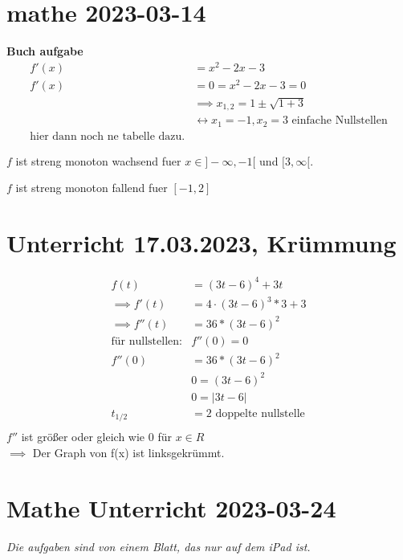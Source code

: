 \documentclass{book}
\begin{document}
\section{mathe 2023-03-14}
\textbf{Buch aufgabe}
\begin{align*}
    f'(x)&= x^2-2x-3\\
    f'(x)&=0=x^2-2x-3=0\\
         &\implies x_{1,2}=1\pm \sqrt{1+3}\\
         &\leftrightarrow x_1 = -1, x_2=\text{3 einfache Nullstellen}\\
         \text{hier dann noch ne tabelle dazu.}
\end{align*}

$f$ ist streng monoton wachsend fuer $x \in]-\infty, -1[$ und $[3,\infty [$.

$f$ ist streng monoton fallend fuer $[-1,2]$


\section{Unterricht 17.03.2023, Krümmung}

\begin{align*}
  f(t)&=(3t-6)^4+3t\\
  \implies f'(t)&=4\cdot (3t-6)^3*3+3\\
  \implies f''(t)&=36* (3t-6)^2\\
  \text{für nullstellen:} &f''(0)=0\\
  f''(0)&=36*(3t-6)^2\\
  &0=(3t-6)^2\\
  &0=|3t-6|\\
  t_{1/2}&=2 \text{ doppelte nullstelle}\\
\end{align*}
$f''$ ist größer oder gleich wie 0 für $x \in R$\\
$\implies$ Der Graph von f(x) ist linksgekrümmt.

\section{Mathe Unterricht 2023-03-24}

\textit{Die aufgaben sind von einem Blatt, das nur auf dem iPad ist.}\\
\end{document}
